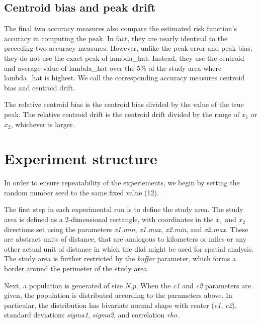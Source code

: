 \subsection{Centroid bias and peak drift}
\label{subsec:method:centroid_bias}

The final two accuracy measures also compare the estimated risk function's accuracy in computing the peak.
In fact, they are nearly identical to the preceding two accuracy measures.
However, unlike the \gls{peak error} and \gls{peak bias}, they do not use the exact peak of \gls{lambda_hat}.
Instead, they use the centroid and average value of \gls{lambda_hat} over the 5\% of the study area where \gls{lambda_hat} is highest.
We call the corresponding accuracy measures \gls{centroid bias} and \gls{centroid drift}.

The \gls{relative centroid bias} is the \gls{centroid bias} divided by the value of the true peak.
The \gls{relative centroid drift} is the \gls{centroid drift} divided by the range of \(x_1\) or \(x_2\), whichever is larger.

\section{Experiment structure}
\label{sec:method:experiment_structure}

In order to ensure repeatability of the experiements, we begin by setting the random number seed to the same fixed value (12).

The first step in each experimental run is to define the study area. 
The study area is defined as a 2-dimensional rectangle, with coordinates in the \(x_1\) and \(x_2\) directions set using the parameters \textit{x1.min}, \textit{x1.max}, \textit{x2.min}, and \textit{x2.max}.
These are abstract units of distance, that are analogous to kilometers or miles or any other actual unit of distance in which the \gls{dkd} might be used for spatial analysis.
The study area is further restricted by the \textit{buffer} parameter, which forms a border around the perimeter of the study area.

Next, a population is generated of size \textit{N.p}.
When the \textit{c1} and \textit{c2} parameters are given, the population is distributed according to the parameters above.
In particular, the distribution has bivariate normal shape with center (\textit{c1}, \textit{c2}),
standard deviations \textit{sigma1}, \textit{sigma2}, and correlation \textit{rho}.

